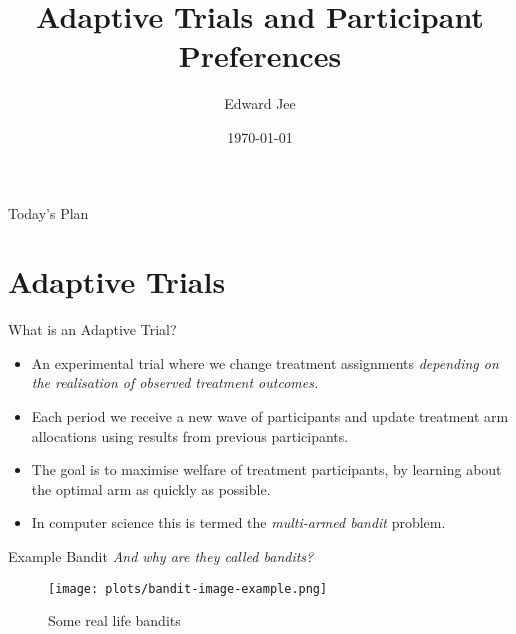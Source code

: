 \documentclass[aspectratio=169,xcolor=dvipsnames]{beamer}
\title[short title]{Adaptive Trials and Participant Preferences} %
\subtitle{}
\author[Edward Jee] {Edward Jee}
\institute[NTU] %
{
Development Tea
}
\date{\today} %
\begin{document}
\begin{frame}
    \titlepage
\end{frame}

\begin{frame}{Today's Plan}
    \tableofcontents
\end{frame}

\section{Adaptive Trials}

\begin{frame}{What is an Adaptive Trial?}

    \begin{itemize}
        \item An experimental trial where we change treatment assignments \textit{depending on the realisation of observed treatment outcomes.}
        \item Each period we receive a new wave of participants and update treatment arm allocations 
        using results from previous participants.
        \item The goal is to maximise welfare of treatment participants, by learning 
        about the optimal arm as quickly as possible. 
        \item In computer science this is termed the \textit{multi-armed bandit} problem.
    \end{itemize}
\end{frame}


\begin{frame}{Example Bandit}
    \textit{And why are they called bandits?}
    \begin{figure}[htbp]
        \centering
        \texttt{[image: plots/bandit-image-example.png]} 
        \caption{Some real life bandits}
        \label{<label>}
    \end{figure}
\end{frame}
\end{document}

